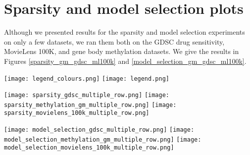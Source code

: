 \documentclass{article}
\begin{document}

	\section{Sparsity and model selection plots}
		Although we presented results for the sparsity and model selection experiments on only a few datasets, we ran them both on the GDSC drug sensitivity, MovieLens 100K, and gene body methylation datasets. We give the results in Figures \ref{sparsity_gm_gdsc_ml100k} and \ref{model_selection_gm_gdsc_ml100k}.
	
		\begin{figure*}[h]
			\centering
			\texttt{[image: legend\_colours.png]}
			\vspace{5pt}
			\texttt{[image: legend.png]}
			\vspace{10pt}
			\begin{minipage}{\textwidth}
				\texttt{[image: sparsity\_gdsc\_multiple\_row.png]}
				\texttt{[image: sparsity\_methylation\_gm\_multiple\_row.png]}
				\texttt{[image: sparsity\_movielens\_100k\_multiple\_row.png]}
				\caption{Sparsity experiment results on the GDSC drug sensitivity (top, a-e), gene body methylation (middle, f-j), and MovieLens 100K (bottom, k-o) datasets. We measure the predictive performance (mean squared error) on a held-out dataset for different fractions of unobserved data.}
				\label{sparsity_gm_gdsc_ml100k}
			\end{minipage}
			\begin{minipage}{\textwidth}
				\texttt{[image: model\_selection\_gdsc\_multiple\_row.png]}
				\texttt{[image: model\_selection\_methylation\_gm\_multiple\_row.png]}
				\texttt{[image: model\_selection\_movielens\_100k\_multiple\_row.png]}
				\caption{Model selection experiment results on the GDSC drug sensitivity (top, a-e), gene body methylation (middle, f-j), and MovieLens 100K (bottom, k-o) datasets. We measure the predictive performance (mean squared error) on a held-out dataset for different dimensionalities $K$.}
				\label{model_selection_gm_gdsc_ml100k}
			\end{minipage}
		\end{figure*}
	

\clearpage
%
%
		
\end{document}
